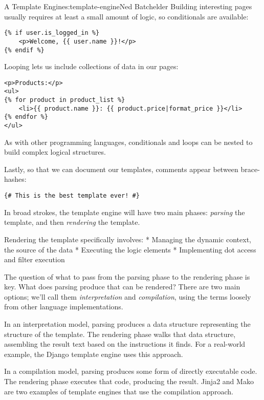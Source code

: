 \begin{aosachapter}{A Template Engine}{s:template-engine}{Ned Batchelder}
Building interesting pages usually requires at least a small amount of
logic, so conditionals are available:

\begin{verbatim}
{% if user.is_logged_in %}
    <p>Welcome, {{ user.name }}!</p>
{% endif %}
\end{verbatim}

Looping lets us include collections of data in our pages:

\begin{verbatim}
<p>Products:</p>
<ul>
{% for product in product_list %}
    <li>{{ product.name }}: {{ product.price|format_price }}</li>
{% endfor %}
</ul>
\end{verbatim}

As with other programming languages, conditionals and loops can be
nested to build complex logical structures.

Lastly, so that we can document our templates, comments appear between
brace-hashes:

\begin{verbatim}
{# This is the best template ever! #}
\end{verbatim}

\label{implementation-approaches}

In broad strokes, the template engine will have two main phases:
\emph{parsing} the template, and then \emph{rendering} the template.

Rendering the template specifically involves: * Managing the dynamic
context, the source of the data * Executing the logic elements *
Implementing dot access and filter execution

The question of what to pass from the parsing phase to the rendering
phase is key. What does parsing produce that can be rendered? There are
two main options; we'll call them \emph{interpretation} and
\emph{compilation}, using the terms loosely from other language
implementations.

In an interpretation model, parsing produces a data structure
representing the structure of the template. The rendering phase walks
that data structure, assembling the result text based on the
instructions it finds. For a real-world example, the Django template
engine uses this approach.

In a compilation model, parsing produces some form of directly
executable code. The rendering phase executes that code, producing the
result. Jinja2 and Mako are two examples of template engines that use
the compilation approach.


\end{aosachapter}
